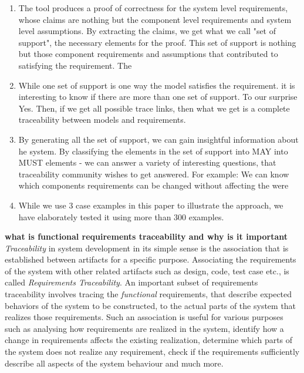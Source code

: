 \begin{enumerate}
  \item The tool produces a proof of correctness for the system level requirements, whose claims are nothing but the component level requirements and system level assumptions. By extracting the claims, we get what we call "set of support", the necessary elements for the proof. This set of support is nothing but those component requirements and assumptions that contributed to satisfying the requirement. The

  \item While one set of support is one way the model satisfies the requirement. it is interesting to know if there are more than one set of support. To our surprise Yes. Then, if we get all possible trace links, then what we get is a complete traceability between models and requirements.


  \item By generating all the set of support, we can gain insightful information about he system. By classifying the elements in the set of support into MAY into MUST elements - we can answer a variety of interesting questions, that traceability community wishes to get answered. For example: We can know which components requirements can be changed without affecting the were

  \item While we use 3 case examples in this paper to illustrate the approach, we have elaborately tested it using more than 300 examples.

\end{enumerate}

\textbf{what is functional requirements traceability and why is it important}
\emph{Traceability} in system development in its simple sense is the association that is established between artifacts for a specific purpose. Associating the requirements of the system with other related artifacts such as design, code, test case etc., is called \emph{Requirements Traceability}. An important subset of requirements traceability involves tracing the {\em functional} requirements, that describe expected behaviors of the system to be constructed, to the actual parts of the system that realizes those requirements. Such an association is useful for various purposes such as analysing how requirements are realized in the system, identify how a change in requirements affects the existing realization, determine which parts of the system does not realize any requirement, check if the requirements sufficiently describe all aspects of the system behaviour and much more. 

